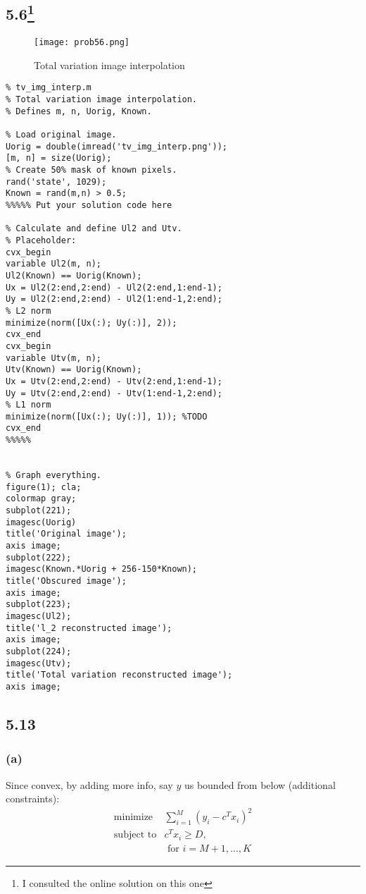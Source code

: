 \documentclass{article}
\begin{document}
\subsection*{5.6\footnote{I consulted the online solution on this one}}
   \begin{figure}[h!]
\begin{center}
  \texttt{[image: prob56.png]}
\end{center}
\caption{Total variation image interpolation}
\end{figure}
\begin{verbatim}
% tv_img_interp.m
% Total variation image interpolation.
% Defines m, n, Uorig, Known.

% Load original image.
Uorig = double(imread('tv_img_interp.png'));
[m, n] = size(Uorig);
% Create 50% mask of known pixels.
rand('state', 1029);
Known = rand(m,n) > 0.5;
%%%%% Put your solution code here

% Calculate and define Ul2 and Utv.
% Placeholder:
cvx_begin
variable Ul2(m, n);
Ul2(Known) == Uorig(Known);
Ux = Ul2(2:end,2:end) - Ul2(2:end,1:end-1);
Uy = Ul2(2:end,2:end) - Ul2(1:end-1,2:end);
% L2 norm
minimize(norm([Ux(:); Uy(:)], 2)); 
cvx_end
cvx_begin
variable Utv(m, n);
Utv(Known) == Uorig(Known);
Ux = Utv(2:end,2:end) - Utv(2:end,1:end-1);
Uy = Utv(2:end,2:end) - Utv(1:end-1,2:end);
% L1 norm
minimize(norm([Ux(:); Uy(:)], 1)); %TODO
cvx_end
%%%%%


% Graph everything.
figure(1); cla;
colormap gray;
subplot(221);
imagesc(Uorig)
title('Original image');
axis image;
subplot(222);
imagesc(Known.*Uorig + 256-150*Known);
title('Obscured image');
axis image;
subplot(223);
imagesc(Ul2);
title('l_2 reconstructed image');
axis image;
subplot(224);
imagesc(Utv);
title('Total variation reconstructed image');
axis image;
\end{verbatim}
\subsection*{5.13}
\subsubsection*{(a)}
Since convex, by adding more info, say $y$ us bounded from below (additional constraints):
  \[  \boxed{  \begin{array}{ll}
    \mbox{minimize}   &  \sum_{i=1}^{M}(y_i-c^Tx_i)^2 \\
    \mbox{subject to} &  c^Tx_i \ge D, \\
    & \text{ for } i=M+1,\dots,K  
         \end{array} 
         }
  \]    
\end{document}
